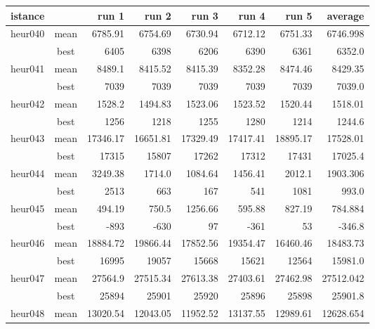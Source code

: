 \documentclass[a4paper,12pt]{article}
\begin{document}
\begin{table}[H]
    \centering
    \begin{tabular}{l|c|r|r|r|r|r|r}
        istance  &   & run 1     & run 2  & run 3     & run 4     & run 5  & average \\ %
        \hline
        heur040 & mean & 6785.91 & 6754.69 & 6730.94 & 6712.12 & 6751.33 & 6746.998 \\
                & best & 6405    & 6398    & 6206    & 6390    & 6361    & 6352.0 \\
        \hline
        heur041 & mean & 8489.1  & 8415.52 & 8415.39 & 8352.28 & 8474.46 & 8429.35 \\
                & best & 7039    & 7039    & 7039    & 7039    & 7039    & 7039.0  \\
        \hline
        heur042 & mean & 1528.2  & 1494.83 & 1523.06 & 1523.52 & 1520.44 & 1518.01 \\
                & best & 1256    & 1218    & 1255    & 1280    & 1214    & 1244.6 \\
        \hline
        heur043 & mean & 17346.17 & 16651.81 & 17329.49 & 17417.41 & 18895.17 & 17528.01 \\
                & best & 17315    & 15807    & 17262    & 17312    & 17431    & 17025.4 \\
        \hline
        heur044 & mean & 3249.38  & 1714.0   & 1084.64  & 1456.41  & 2012.1   & 1903.306 \\
                & best & 2513     & 663      & 167      & 541      & 1081     & 993.0 \\
        \hline
        heur045 & mean & 494.19   & 750.5    & 1256.66  & 595.88   & 827.19 & 784.884\\
                & best & -893     & -630     & 97 & -361     & 53 & -346.8\\
        \hline
        heur046 & mean & 18884.72 & 19866.44 & 17852.56 & 19354.47 & 16460.46 & 18483.73 \\
                & best & 16995    & 19057    & 15668    & 15621    & 12564    & 15981.0 \\
        \hline
        heur047 & mean & 27564.9  & 27515.34 & 27613.38 & 27403.61 & 27462.98 & 27512.042 \\
                & best & 25894    & 25901    & 25920    & 25896    & 25898    & 25901.8\\
        \hline
        heur048 & mean & 13020.54 & 12043.05 & 11952.52 & 13137.55 & 12989.61 & 12628.654 \\

\end{tabular}
\end{table}
\end{document}
